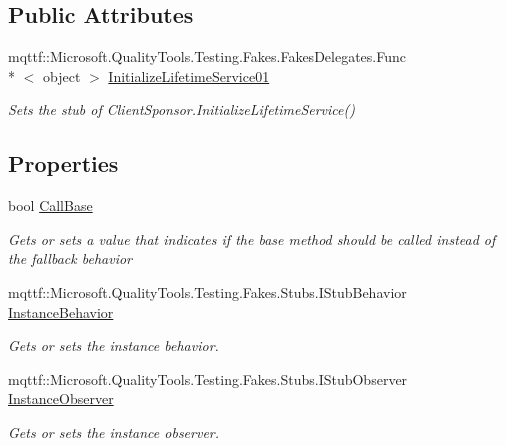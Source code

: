 \subsection*{Public Attributes}
\begin{DoxyCompactItemize}
\item 
mqttf\-::\-Microsoft.\-Quality\-Tools.\-Testing.\-Fakes.\-Fakes\-Delegates.\-Func\\*
$<$ object $>$ \hyperlink{class_system_1_1_runtime_1_1_remoting_1_1_lifetime_1_1_fakes_1_1_stub_client_sponsor_a22a17dfae7a17f5dbc49a48a6fb8284b}{Initialize\-Lifetime\-Service01}
\begin{DoxyCompactList}\small\item\em Sets the stub of Client\-Sponsor.\-Initialize\-Lifetime\-Service()\end{DoxyCompactList}\end{DoxyCompactItemize}
\subsection*{Properties}
\begin{DoxyCompactItemize}
\item 
bool \hyperlink{class_system_1_1_runtime_1_1_remoting_1_1_lifetime_1_1_fakes_1_1_stub_client_sponsor_a532f5225a9cfd67d4473d48606214ab8}{Call\-Base}
\begin{DoxyCompactList}\small\item\em Gets or sets a value that indicates if the base method should be called instead of the fallback behavior\end{DoxyCompactList}\item 
mqttf\-::\-Microsoft.\-Quality\-Tools.\-Testing.\-Fakes.\-Stubs.\-I\-Stub\-Behavior \hyperlink{class_system_1_1_runtime_1_1_remoting_1_1_lifetime_1_1_fakes_1_1_stub_client_sponsor_a9e90a81c576799d231cf882cb3203617}{Instance\-Behavior}
\begin{DoxyCompactList}\small\item\em Gets or sets the instance behavior.\end{DoxyCompactList}\item 
mqttf\-::\-Microsoft.\-Quality\-Tools.\-Testing.\-Fakes.\-Stubs.\-I\-Stub\-Observer \hyperlink{class_system_1_1_runtime_1_1_remoting_1_1_lifetime_1_1_fakes_1_1_stub_client_sponsor_aa46e8af4f2f56273e0d317f820ed9237}{Instance\-Observer}
\begin{DoxyCompactList}\small\item\em Gets or sets the instance observer.\end{DoxyCompactList}\end{DoxyCompactItemize}


